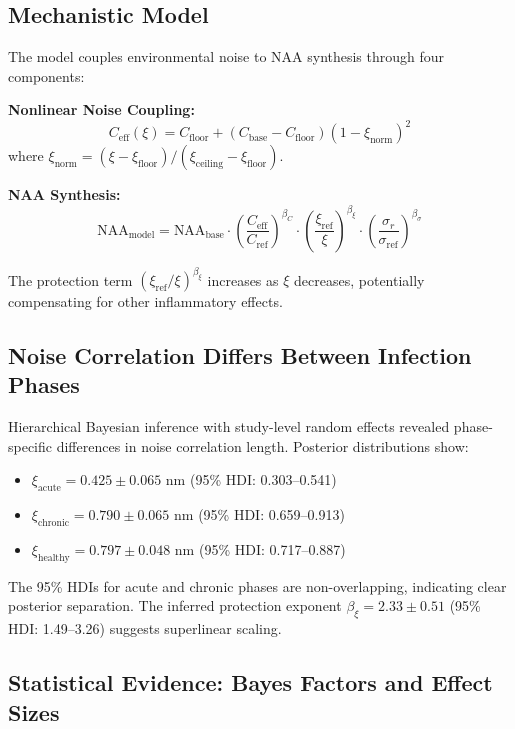 \documentclass[10pt,a4paper]{article}
\begin{document}
\subsection{Mechanistic Model}

The model couples environmental noise to NAA synthesis through four components:

\textbf{Nonlinear Noise Coupling:}
\begin{equation}
C_{\text{eff}}(\xi) = C_{\text{floor}} + (C_{\text{base}} - C_{\text{floor}})(1 - \xi_{\text{norm}})^2
\end{equation}
where $\xi_{\text{norm}} = (\xi - \xi_{\text{floor}})/(\xi_{\text{ceiling}} - \xi_{\text{floor}})$.

\textbf{NAA Synthesis:}
\begin{equation}
\text{NAA}_{\text{model}} = \text{NAA}_{\text{base}} \cdot \left(\frac{C_{\text{eff}}}{C_{\text{ref}}}\right)^{\beta_C} \cdot \left(\frac{\xi_{\text{ref}}}{\xi}\right)^{\beta_\xi} \cdot \left(\frac{\sigma_r}{\sigma_{\text{ref}}}\right)^{\beta_\sigma}
\end{equation}

The protection term $(\xi_{\text{ref}}/\xi)^{\beta_\xi}$ increases as $\xi$ decreases, potentially compensating for other inflammatory effects.

\subsection{Noise Correlation Differs Between Infection Phases}

Hierarchical Bayesian inference with study-level random effects revealed phase-specific differences in noise correlation length. Posterior distributions show:

\begin{itemize}
\item $\xi_{\text{acute}} = 0.425 \pm 0.065$ nm (95\% HDI: 0.303--0.541)
\item $\xi_{\text{chronic}} = 0.790 \pm 0.065$ nm (95\% HDI: 0.659--0.913)
\item $\xi_{\text{healthy}} = 0.797 \pm 0.048$ nm (95\% HDI: 0.717--0.887)
\end{itemize}

The 95\% HDIs for acute and chronic phases are non-overlapping, indicating clear posterior separation. The inferred protection exponent $\beta_\xi = 2.33 \pm 0.51$ (95\% HDI: 1.49--3.26) suggests superlinear scaling.

\subsection{Statistical Evidence: Bayes Factors and Effect Sizes}
\end{document}

